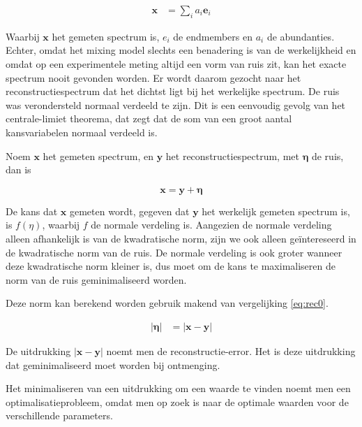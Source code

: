 \documentclass[12pt]{report}
\begin{document}


\begin{align}
\bm{x} &= \sum_i a_i \bm{e}_i \label{eq:nq}
\end{align}

Waarbij $\bm{x}$ het gemeten spectrum is, $e_i$ de endmembers en  $a_i$ de abundanties.
Echter, omdat het mixing model slechts een benadering is van de werkelijkheid en omdat op een experimentele meting altijd een vorm van ruis zit, kan het exacte spectrum nooit gevonden worden. Er wordt daarom gezocht naar het reconstructiespectrum dat het dichtst ligt bij het werkelijke spectrum. De ruis was verondersteld normaal verdeeld te zijn. Dit is een eenvoudig gevolg van het centrale-limiet theorema, dat zegt dat de som van een groot aantal kansvariabelen normaal verdeeld is. 

Noem $\bm{x}$ het gemeten spectrum, en $\bm{y}$ het reconstructiespectrum, met $\bm{\eta}$ de ruis, dan is

\begin{equation}\label{eq:rec0}
\bm{x} = \bm{y} + \bm{\eta}
\end{equation}

De kans dat $\bm{x}$ gemeten wordt, gegeven dat $\bm{y}$ het werkelijk gemeten spectrum is, is $f(\eta)$, waarbij $f$ de normale verdeling is. Aangezien de normale verdeling alleen afhankelijk is van de kwadratische norm, zijn we ook alleen ge\"intereseerd in de kwadratische norm van de ruis. De normale verdeling is ook groter wanneer deze kwadratische norm kleiner is, dus moet om de kans te maximaliseren de norm van de ruis geminimaliseerd worden. 

Deze norm kan berekend worden gebruik makend van vergelijking \ref{eq:rec0}.

\begin{eqnarray}
\left|\bm{\eta}\right| &= \left|\bm{x} - \bm{y}\right| \label{eq:rec}
\end{eqnarray}

De uitdrukking $\left|\bm{x} - \bm{y}\right|$ noemt men de reconstructie-error. Het is deze uitdrukking dat geminimaliseerd moet worden bij ontmenging. 

Het minimaliseren van een uitdrukking om een waarde te vinden noemt men een optimalisatieprobleem, omdat men op zoek is naar de optimale waarden voor de verschillende parameters.
\end{document}

